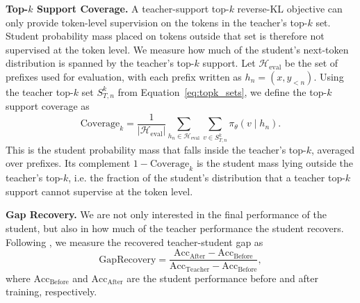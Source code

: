 \textbf{Top-$k$ Support Coverage.}
A teacher-support top-$k$ reverse-KL objective can only provide token-level supervision on the tokens in the teacher's top-$k$ set. Student probability mass placed on tokens outside that set is therefore not supervised at the token level. We measure how much of the student's next-token distribution is spanned by the teacher's top-$k$ support. Let $\mathcal{H}_{\mathrm{eval}}$ be the set of prefixes used for evaluation, with each prefix written as $h_n=(x,y_{<n})$. Using the teacher top-$k$ set $S_{T,n}^{k}$ from Equation~\ref{eq:topk_sets}, we define the top-$k$ support coverage as
\begin{equation}
\mathrm{Coverage}_{k}
=
\frac{1}{|\mathcal{H}_{\mathrm{eval}}|}
\sum_{h_n \in \mathcal{H}_{\mathrm{eval}}}
\sum_{v \in S_{T,n}^{k}}
\pi_\theta(v \mid h_n).
\label{eq:topk_support_coverage}
\end{equation}
This is the student probability mass that falls inside the teacher's top-$k$, averaged over prefixes. Its complement $1-\mathrm{Coverage}_{k}$ is the student mass lying outside the teacher's top-$k$, i.e. the fraction of the student's distribution that a teacher top-$k$ support cannot supervise at the token level.

\noindent\textbf{Gap Recovery.}
We are not only interested in the final performance of the student, but also in how much of the teacher performance the student recovers. Following \citet{liRethinkingOnPolicyDistillation2026}, we measure the recovered teacher-student gap as
\begin{equation}
\mathrm{GapRecovery}
=
\frac{\mathrm{Acc}_{\mathrm{After}}-\mathrm{Acc}_{\mathrm{Before}}}
{\mathrm{Acc}_{\mathrm{Teacher}}-\mathrm{Acc}_{\mathrm{Before}}},
\end{equation}
where $\mathrm{Acc}_{\mathrm{Before}}$ and $\mathrm{Acc}_{\mathrm{After}}$ are the student performance before and after training, respectively.
